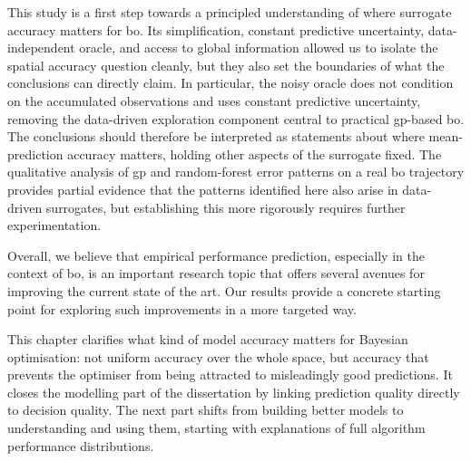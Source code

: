 This study is a first step towards a principled understanding of where surrogate accuracy matters for \gls{bo}. Its simplification, constant predictive uncertainty, data-independent oracle, and access to global information allowed us to isolate the spatial accuracy question cleanly, but they also set the boundaries of what the conclusions can directly claim. In particular, the noisy oracle does not condition on the accumulated observations and uses constant predictive uncertainty, removing the data-driven exploration component central to practical \gls{gp}-based \gls{bo}. The conclusions should therefore be interpreted as statements about where mean-prediction accuracy matters, holding other aspects of the surrogate fixed. The qualitative analysis of \gls{gp} and random-forest error patterns on a real \gls{bo} trajectory provides partial evidence that the patterns identified here also arise in data-driven surrogates, but establishing this more rigorously requires further experimentation.

Overall, we believe that empirical performance prediction, especially in the context of \gls{bo}, is an important research topic that offers several avenues for improving the current state of the art. Our results provide a concrete starting point for exploring such improvements in a more targeted way.

This chapter clarifies what kind of model accuracy matters for Bayesian optimisation: not uniform accuracy over the whole space, but accuracy that prevents the optimiser from being attracted to misleadingly good predictions.
It closes the modelling part of the dissertation by linking prediction quality directly to decision quality.
The next part shifts from building better models to understanding and using them, starting with explanations of full algorithm performance distributions.
